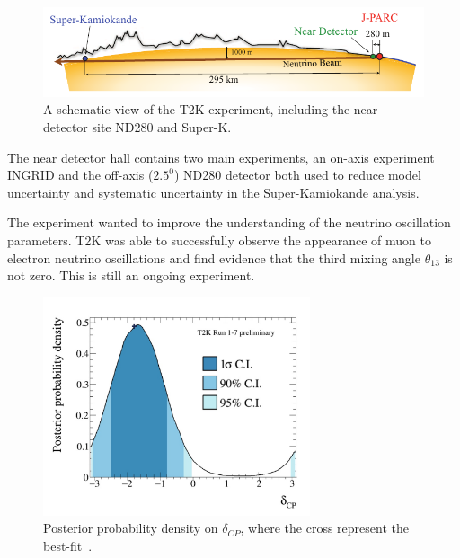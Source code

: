 \begin{figure}[h!]
\centering
  \centering
\includegraphics[width=\textwidth]{figures/T2KBeam.png}
\vspace{2mm}
\caption{A schematic view of the T2K experiment, including the near detector site ND280 and Super-K.}
\label{fig:T2K}
\end{figure}

The near detector hall contains two main experiments, an on-axis experiment INGRID and the off-axis ($2.5^0$) ND280 detector both used to reduce model uncertainty and systematic uncertainty in the Super-Kamiokande analysis. %

The experiment wanted to improve the understanding of the neutrino oscillation parameters. T2K was able to successfully observe the appearance of muon to electron neutrino oscillations and find evidence that the third mixing angle $\theta_{13}$ is not zero. This is still an ongoing experiment. 

\begin{figure}[h!]
\centering
  \centering
\includegraphics[width=0.7\textwidth]{figures/t2k1.jpeg}
\vspace{2mm}
\caption{Posterior probability density on $\delta_{CP}$, where the cross represent the best-fit~\cite{T2Kfigures}.}
\label{fig:T2KCP}
\end{figure}

